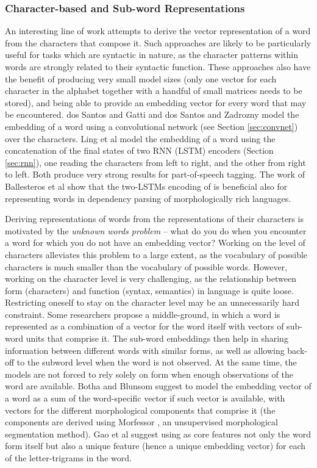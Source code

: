 \documentclass[jair,twoside,11pt,theapa]{article}
\renewcommand{\shortcite}[0]{\citeyear}
\begin{document}
{\subsubsection{Character-based and Sub-word Representations} 
An interesting line of work attempts to derive the vector representation of a
word from the characters that compose it.  Such approaches are likely to be
particularly useful for tasks which are syntactic in nature, as the character
patterns within words are strongly related to their syntactic function.  These
approaches also have the benefit of producing very small model sizes (only
one vector for each character in the alphabet together with a handful of small
matrices needs to be stored), and being able to provide an embedding vector for
every word that may be encountered.  
dos Santos and Gatti \shortcite{dossantos2014deep} and dos Santos and Zadrozny
\shortcite{santos2014learning} model the embedding of a word using a
convolutional network (see Section \ref{sec:convnet}) over the characters.
Ling et al \shortcite{ling2015finding} model the embedding of a word using the
concatenation of the final states of two RNN (LSTM) encoders (Section \ref{sec:rnn}), one
reading the characters from left to right, and the other from right to left.
Both produce very strong results for part-of-speech tagging. The work of
Ballesteros et al \shortcite{ballesteros2015improved} show that the two-LSTMs encoding of
\cite{ling2015finding} is beneficial also for representing words in dependency
parsing of morphologically rich languages.

Deriving representations of words from the representations of their characters
is motivated by the \emph{unknown words problem} -- what do you do when you
encounter a word for which you do not have an embedding vector?  Working on the
level of characters alleviates this problem to a large extent, as the vocabulary
of possible characters is much smaller than the vocabulary of possible words.
However, working on the character level is very challenging, as the relationship
between form (characters) and function (syntax, semantics) in language is quite
loose.  Restricting oneself to stay on the character level may be an
unnecessarily hard constraint.
Some researchers propose a middle-ground, in which a word is represented as a
combination of a vector for the word itself with vectors of sub-word units that
comprise it.  The sub-word embeddings then help in sharing information between
different words with similar forms, as well as allowing back-off to the subword
level when the word is not observed.  At the same time, the models are not
forced to rely solely on form when enough observations of the word are available.
Botha and Blunsom \shortcite{botha2014compositional} suggest to
model the embedding vector of a word as a sum of the word-specific vector if such vector
is available, with vectors
for the different morphological components that comprise it (the components are
derived using Morfessor \cite{creutz2007unsupervised}, an unsupervised morphological
segmentation method).  Gao et al \cite{gao2014modeling} suggest using as core
features not only the word form itself but also a unique feature (hence a unique
embedding vector) for each of the letter-trigrams in the word.


}
\end{document}
